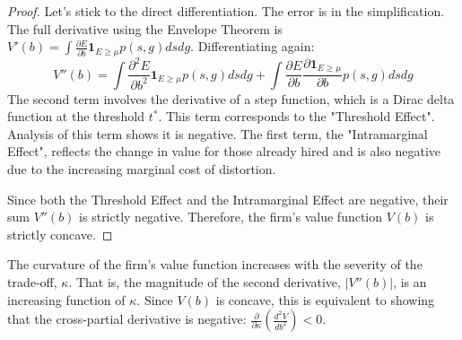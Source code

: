 \begin{proof}
    Let's stick to the direct differentiation. The error is in the simplification. The full derivative using the Envelope Theorem is $V'(b) = \int \frac{\partial E}{\partial b} \mathbf{1}_{E \ge \mu} p(s,g) ds dg$.
    Differentiating again:
    $$ V''(b) = \int \frac{\partial^2 E}{\partial b^2} \mathbf{1}_{E \ge \mu} p(s,g) ds dg + \int \frac{\partial E}{\partial b} \frac{\partial \mathbf{1}_{E \ge \mu}}{\partial b} p(s,g) ds dg $$
    The second term involves the derivative of a step function, which is a Dirac delta function at the threshold $t^*$. This term corresponds to the "Threshold Effect". Analysis of this term shows it is negative. The first term, the "Intramarginal Effect", reflects the change in value for those already hired and is also negative due to the increasing marginal cost of distortion.
    
    Since both the Threshold Effect and the Intramarginal Effect are negative, their sum $V''(b)$ is strictly negative. Therefore, the firm's value function $V(b)$ is strictly concave.
    \end{proof}

\begin{lemma}
    \label{lemma:flattening}
    The curvature of the firm's value function increases with the severity of the trade-off, $\kappa$. That is, the magnitude of the second derivative, $|V''(b)|$, is an increasing function of $\kappa$. Since $V(b)$ is concave, this is equivalent to showing that the cross-partial derivative is negative: $\frac{\partial}{\partial \kappa} \left( \frac{d^2V}{db^2} \right) < 0$.
    \end{lemma}
    

